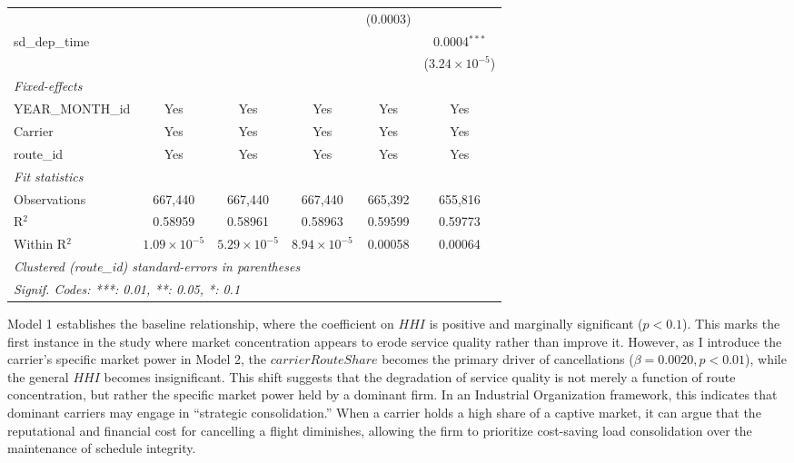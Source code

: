 \documentclass[preprint,12pt,authoryear]{elsarticle}
\begin{document}
\begin{table}[htbp]
\begin{tabular}{lccccc}
                          &                       &                       &                       & (0.0003)        &   \\   
      sd\_dep\_time       &                       &                       &                       &                 & 0.0004$^{***}$\\   
                          &                       &                       &                       &                 & ($3.24\times 10^{-5}$)\\    
      \midrule
      \emph{Fixed-effects}\\
      YEAR\_MONTH\_id     & Yes                   & Yes                   & Yes                   & Yes             & Yes\\  
      Carrier             & Yes                   & Yes                   & Yes                   & Yes             & Yes\\  
      route\_id           & Yes                   & Yes                   & Yes                   & Yes             & Yes\\  
      \midrule
      \emph{Fit statistics}\\
      Observations        & 667,440               & 667,440               & 667,440               & 665,392         & 655,816\\  
      R$^2$               & 0.58959               & 0.58961               & 0.58963               & 0.59599         & 0.59773\\  
      Within R$^2$        & $1.09\times 10^{-5}$  & $5.29\times 10^{-5}$  & $8.94\times 10^{-5}$  & 0.00058         & 0.00064\\  
      \midrule \midrule
      \multicolumn{6}{l}{\emph{Clustered (route\_id) standard-errors in parentheses}}\\
      \multicolumn{6}{l}{\emph{Signif. Codes: ***: 0.01, **: 0.05, *: 0.1}}\\
   \end{tabular}
\end{table}


Model 1 establishes the baseline relationship, where the coefficient on $HHI$ is positive and marginally significant ($p < 0.1$). This marks the first instance in the study where market concentration appears to erode service quality rather than improve it. However, as I introduce the carrier’s specific market power in Model 2, the $carrierRouteShare$ becomes the primary driver of cancellations ($\beta = 0.0020, p < 0.01$), while the general $HHI$ becomes insignificant. This shift suggests that the degradation of service quality is not merely a function of route concentration, but rather the specific market power held by a dominant firm. In an Industrial Organization framework, this indicates that dominant carriers may engage in ``strategic consolidation.'' When a carrier holds a high share of a captive market, it can argue that the reputational and financial cost for cancelling a flight diminishes, allowing the firm to prioritize cost-saving load consolidation over the maintenance of schedule integrity.
\end{document}
